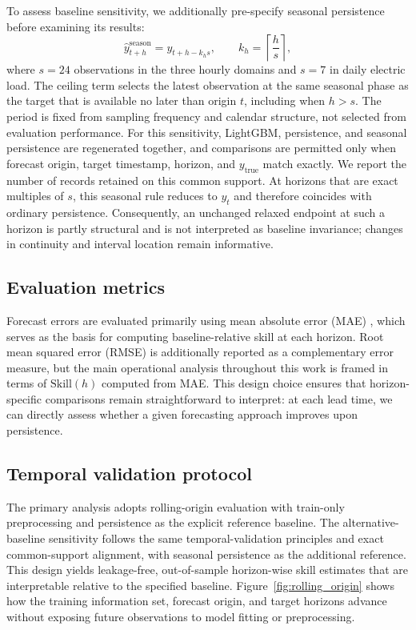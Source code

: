 \documentclass[pdflatex]{sn-jnl}
\begin{document}
To assess baseline sensitivity, we additionally pre-specify seasonal
persistence before examining its results:
\begin{equation}
  \hat y^{\mathrm{season}}_{t+h}=y_{t+h-k_hs},
  \qquad k_h=\left\lceil\frac{h}{s}\right\rceil,
\end{equation}
where $s=24$ observations in the three hourly domains and $s=7$ in daily
electric load. The ceiling term selects the latest observation at the same
seasonal phase as the target that is available no later than origin $t$,
including when $h>s$. The period is fixed from sampling frequency and calendar
structure, not selected from evaluation performance. For this sensitivity,
LightGBM, persistence, and seasonal persistence are regenerated together, and
comparisons are permitted only when forecast origin, target timestamp, horizon,
and $y_{\mathrm{true}}$ match exactly. We report the number of records retained
on this common support.
At horizons that are exact multiples of $s$, this seasonal rule reduces to
$y_t$ and therefore coincides with ordinary persistence. Consequently, an
unchanged relaxed endpoint at such a horizon is partly structural and is not
interpreted as baseline invariance; changes in continuity and interval location
remain informative.

\subsection{Evaluation metrics}

Forecast errors are evaluated primarily using mean absolute error (MAE) \citep{hyndman2006}, which serves as the basis for computing baseline-relative skill at each horizon. Root mean squared error (RMSE) is additionally reported as a complementary error measure, but the main operational analysis throughout this work is framed in terms of $\mathrm{Skill}(h)$ computed from MAE. This design choice ensures that horizon-specific comparisons remain straightforward to interpret: at each lead time, we can directly assess whether a given forecasting approach improves upon persistence.

\subsection{Temporal validation protocol}
The primary analysis adopts rolling-origin evaluation with train-only preprocessing and persistence as the explicit reference baseline. The alternative-baseline sensitivity follows the same temporal-validation principles and exact common-support alignment, with seasonal persistence as the additional reference. This design yields leakage-free, out-of-sample horizon-wise skill estimates that are interpretable relative to the specified baseline.
Figure~\ref{fig:rolling_origin} shows how the training information set,
forecast origin, and target horizons advance without exposing future
observations to model fitting or preprocessing.
\end{document}
